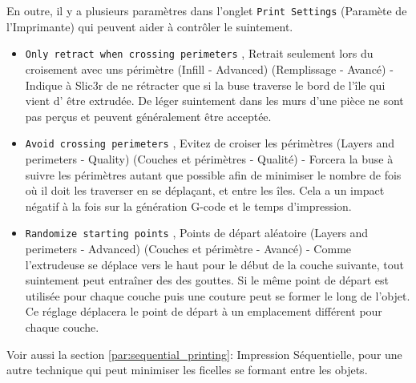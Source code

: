 En outre, il y a plusieurs param\`etres dans l'onglet \texttt{Print Settings} (Param\`ete de l'Imprimante) qui peuvent aider \`a contr\^oler le suintement.

\begin{itemize}
    \item \texttt{Only retract when crossing perimeters} , Retrait seulement lors du croisement avec uns p\'erim\`etre (Infill - Advanced) (Remplissage - Avanc\'e) - Indique \`a Slic3r de ne r\'etracter que si la buse traverse le bord de l'\^ile qui vient d' \^etre extrud\'ee. De l\'eger suintement dans les murs d'une pi\`ece ne sont pas perçus et peuvent g\'en\'eralement \^etre accept\'ee.
	\item \texttt{Avoid crossing perimeters} , Evitez de croiser les p\'erim\`etres (Layers and perimeters - Quality) (Couches et p\'erim\`etres - Qualit\'e) - Forcera la buse \`a suivre les p\'erim\`etres autant que possible afin de minimiser le nombre de fois o\`u il doit les traverser en se d\'eplaçant, et entre les \^iles. Cela a un impact n\'egatif \`a la fois sur la g\'en\'eration G-code et le temps d'impression.
	\item \texttt{Randomize starting points} , Points de d\'epart al\'eatoire (Layers and perimeters - Advanced) (Couches et p\'erim\`etre - Avanc\'e) - Comme l'extrudeuse se d\'eplace vers le haut pour le d\'ebut de la couche suivante, tout suintement peut entra\^iner des des gouttes. Si le m\^eme point de d\'epart est utilis\'ee pour chaque couche puis une couture peut se former le long de l'objet. Ce r\'eglage d\'eplacera le point de d\'epart \`a un emplacement diff\'erent pour chaque couche.
\end{itemize}


Voir aussi la section \ref{par:sequential_printing}: Impression S\'equentielle, pour une autre technique qui peut minimiser les ficelles se formant entre les objets.
